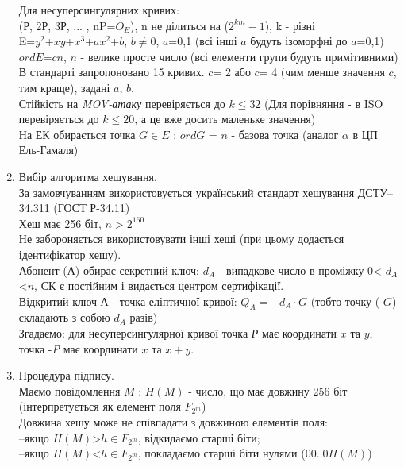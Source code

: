 \begin{enumerate}
        Для несуперсингулярних кривих:\\
        (Р, 2Р, 3Р, ... , nP=$O_{E}$), n не ділиться на ($2^{km}-1$), k - різні\\
        E=$y^{2}$+$xy$+$x^{3}$+$ax^{2}$+$b$, $b\neq 0$, $a$=0,1 (всі інші $a$ будуть ізоморфні до $a$=0,1)\\
        $ord E$=$cn$, $n$ - велике просте число (всі елементи групи будуть примітивними)\\
        В стандарті запропоновано 15 кривих. $c$= 2 або $c$= 4 (чим менше значення $c$, тим краще), задані $a$, $b$.\\
        Стійкість на \emph{MOV-атаку} перевіряється до $k\leq 32$ (Для порівняння - в ISO перевіряється до $k\leq 20$, а це вже досить маленьке значення)\\
        На ЕК обирається точка $G\in E$ : $ord G$ = $n$ - базова точка (аналог $\alpha$ в ЦП Ель-Гамаля)\\
        \item Вибір алгоритма хешування.\\
        За замовчуванням використовується український стандарт хешування ДСТУ--34.311 (ГОСТ Р-34.11)\\
        Хеш має 256 біт, $n>2^{160}$\\
        Не забороняється використовувати інші хеші (при цьому додається ідентифікатор хешу).\\
        Абонент (А) обирає секретний ключ: $d_{A}$ - випадкове число в проміжку 0< $d_{A}$ <$n$, СК є постійним і видається центром сертифікації.\\
        Відкритий ключ А - точка еліптичної кривої: $Q_{A}=-d_{A}\cdot G$ (тобто точку (-$G$) складають з собою $d_{A}$ разів)\\
        Згадаємо: для несуперсингулярної кривої точка \textit{Р} має координати $x$ та $y$, точка -\textit{P} має координати $x$ та $x+y$.\\
        \item Процедура підпису.\\
        Маємо повідомлення $M$ : $H(M)$ - число, що має довжину 256 біт (інтерпретується як елемент поля $F_{2^{m}}$)\\
        Довжина хешу може не співпадати з довжиною елементів поля:\\
        --якщо $H(M)$>$h\in F_{2^{m}}$, відкидаємо старші біти;\\
        --якщо $H(M)$<$h\in F_{2^{m}}$, покладаємо старші біти нулями (00..0$H(M)$)\\

\end{enumerate}
